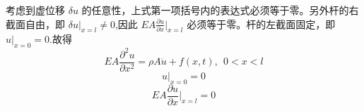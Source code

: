 \documentclass[12pt,a4paper]{article}
\begin{document}
考虑到虚位移 $\delta u$ 的任意性，上式第一项括号内的表达式必须等于零。另外杆的右截面自由，即 $\delta u|_{x=l}\ne 0$,因此 $EA\frac{\partial u}{\partial x}|_{x=l}$ 必须等于零。杆的左截面固定，即 $u|_{x=0}=0$.故得
$$
EA\frac{\partial^2 u}{\partial x^2}=\rho A\ddot{u}+f(x,t), ~~ 0<x<l
$$
$$
u|_{x=0}=0
$$
$$
EA\frac{\partial u}{\partial x}|_{x=l}=0
$$








































































%

%
\end{document}
